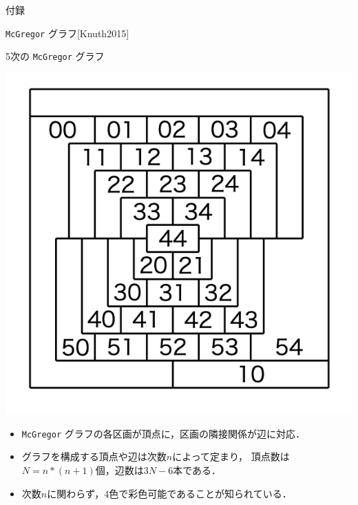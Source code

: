 \documentclass[dvipdfmx,11pt]{beamer}
\newcommand{\code}[1]{\lstinline[basicstyle=\ttfamily]{#1}}
\begin{document}


\appendix
\begin{frame}[noframenumbering]{}
 \thispagestyle{empty}
 \Huge 付録
\end{frame}

\begin{frame}[noframenumbering]{ \code{McGregor} グラフ[Knuth2015]}
 \thispagestyle{empty}
 \begin{exampleblock}{5次の \code{McGregor} グラフ}
  \begin{center}
   \includegraphics[scale=0.2]{fig/order5.png}
  \end{center}
 \end{exampleblock}

 \begin{itemize}
  \item \code{McGregor} グラフの各区画が頂点に，区画の隣接関係が辺に対応．
  \item グラフを構成する頂点や辺は次数$n$によって定まり，
	頂点数は$N=n*(n+1)$個，辺数は$3N-6$本である．%
  \item 次数$n$に関わらず，4色で彩色可能であることが知られている．
 \end{itemize}
\end{frame}
\end{document}
